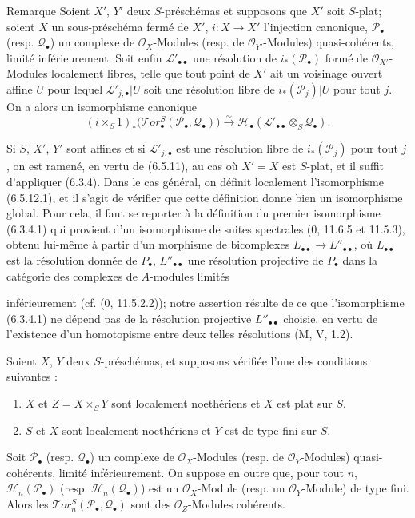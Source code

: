 \begin{namedtheorem}[6.5.12]{Remarque}
Soient $X'$, $Y'$ deux $S$-préschémas et supposons que $X'$ soit $S$-plat;
soient $X$ un sous-préschéma fermé de $X'$, $i:X\to X'$ l'injection canonique,
$\mathscr P_\bullet$ (resp. $\mathscr Q_\bullet$) un complexe de
$\mathscr O_X$-Modules (resp. de $\mathscr O_{Y'}$-Modules) quasi-cohérents,
limité inférieurement. Soit enfin $\mathscr L'_{\bullet\bullet}$ une résolution
de $i_*(\mathscr P_\bullet)$ formé de $\mathscr O_{X'}$-Modules localement
libres, telle que tout point de $X'$ ait un voisinage ouvert affine $U$ pour
lequel $\mathscr L'_{j,\bullet}|U$ soit une résolution libre de
$i_*(\mathscr P_j)|U$ pour tout $j$. On a alors un isomorphisme canonique
\[
  (i\times_S 1)_*
  \bigl(\mathscr{T}\!or_\bullet^S
    (\mathscr P_\bullet,\mathscr Q_\bullet)\bigr)
  \xrightarrow{\sim}
  \mathscr H_\bullet
  (\mathscr L'_{\bullet\bullet}\otimes_S\mathscr Q_\bullet).
  \tag{6.5.12.1}\label{III.6.5.12.1.fr}
\]

Si $S$, $X'$, $Y'$ sont affines et si $\mathscr L'_{j,\bullet}$ est une
résolution libre de $i_*(\mathscr P_j)$ pour tout $j$, on est ramené, en vertu
de (6.5.11), au cas où $X'=X$ est $S$-plat, et il suffit d'appliquer (6.3.4).
Dans le cas général, on définit localement l'isomorphisme (6.5.12.1), et il
s'agit de vérifier que cette définition donne bien un isomorphisme global.
Pour cela, il faut se reporter à la définition du premier isomorphisme
(6.3.4.1) qui provient d'un isomorphisme de suites spectrales (0, 11.6.5 et
11.5.3), obtenu lui-même à partir d'un morphisme de bicomplexes
$L_{\bullet\bullet}\to L''_{\bullet\bullet}$, où $L_{\bullet\bullet}$ est la
résolution donnée de $P_\bullet$, $L''_{\bullet\bullet}$ une résolution
projective de $P_\bullet$ dans la catégorie des complexes de $A$-modules
limités

inférieurement (cf. (0, 11.5.2.2)); notre assertion résulte de ce que
l'isomorphisme (6.3.4.1) ne dépend pas de la résolution projective
$L''_{\bullet\bullet}$ choisie, en vertu de l'existence d'un homotopisme entre
deux telles résolutions (M, V, 1.2).
\end{namedtheorem}

\begin{proposition}[6.5.13]
Soient $X$, $Y$ deux $S$-préschémas, et supposons vérifiée l'une des conditions
suivantes :
\begin{enumerate}
  \item[(i)] $X$ et $Z=X\times_S Y$ sont localement noethériens et $X$ est plat
    sur $S$.
  \item[(ii)] $S$ et $X$ sont localement noethériens et $Y$ est de type fini
    sur $S$.
\end{enumerate}
Soit $\mathscr P_\bullet$ (resp. $\mathscr Q_\bullet$) un complexe de
$\mathscr O_X$-Modules (resp. de $\mathscr O_Y$-Modules) quasi-cohérents,
limité inférieurement. On suppose en outre que, pour tout $n$,
$\mathscr H_n(\mathscr P_\bullet)$ (resp.
$\mathscr H_n(\mathscr Q_\bullet)$) est un $\mathscr O_X$-Module (resp. un
$\mathscr O_Y$-Module) de type fini. Alors les
$\mathscr{T}\!or_n^S(\mathscr P_\bullet,\mathscr Q_\bullet)$ sont des
$\mathscr O_Z$-Modules cohérents.
\end{proposition}

